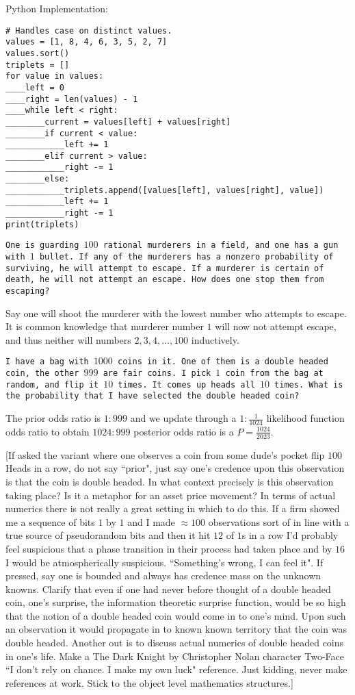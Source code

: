 Python Implementation:

\begin{verbatim}
# Handles case on distinct values.
values = [1, 8, 4, 6, 3, 5, 2, 7]
values.sort()
triplets = []
for value in values:
____left = 0
____right = len(values) - 1
____while left < right:
________current = values[left] + values[right]
________if current < value:
____________left += 1
________elif current > value:
____________right -= 1
________else:
____________triplets.append([values[left], values[right], value])
____________left += 1
____________right -= 1
print(triplets)
\end{verbatim}

\texttt{One is guarding $100$ rational murderers in a field, and one has a gun with $1$ bullet. If any of the murderers has a nonzero probability of surviving, he will attempt to escape. If a murderer is certain of death, he will not attempt an escape. How does one stop them from escaping?}

Say one will shoot the murderer with the lowest number who attempts to escape. It is common knowledge that murderer number $1$ will now not attempt escape, and thus neither will numbers $2,3,4,\dots,100$ inductively.

\texttt{I have a bag with $1000$ coins in it. One of them is a double headed coin, the other $999$ are fair coins. I pick $1$ coin from the bag at random, and flip it $10$ times. It comes up heads all $10$ times. What is the probability that I have selected the double headed coin?}

The prior odds ratio is $1:999$ and we update through a $1:\frac{1}{1024}$ likelihood function odds ratio to obtain $1024:999$ posterior odds ratio is a $P=\boxed{\frac{1024}{2023}}$.

[If asked the variant where one observes a coin from some dude's pocket flip $100$ Heads in a row, do not say ``prior", just say one's credence upon this observation is that the coin is double headed. In what context precisely is this observation taking place? Is it a metaphor for an asset price movement? In terms of actual numerics there is not really a great setting in which to do this. If a firm showed me a sequence of bits $1$ by $1$ and I made $\approx 100$ observations sort of in line with a true source of pseudorandom bits and then it hit $12$ of $1$s in a row I'd probably feel suspicious that a phase transition in their process had taken place and by $16$ I would be atmospherically suspicious. ``Something's wrong, I can feel it". If pressed, say one is bounded and always has credence mass on the unknown knowns. Clarify that even if one had never before thought of a double headed coin, one's surprise, the information theoretic surprise function, would be so high that the notion of a double headed coin would come in to one's mind. Upon such an observation it would propagate in to known known territory that the coin was double headed. Another out is to discuss actual numerics of double headed coins in one's life. Make a The Dark Knight by Christopher Nolan character Two-Face ``I don't rely on chance. I make my own luck" reference. Just kidding, never make references at work. Stick to the object level mathematics structures.]

